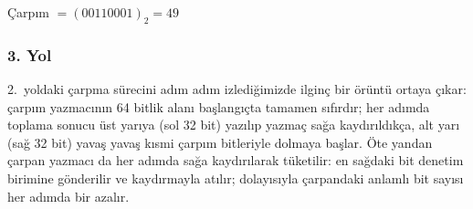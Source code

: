 \begin{ornek}[5.5]
Çarpım $= (00110001)_2 = 49$
\end{ornek}

\subsubsection{3. Yol}

2.\ yoldaki çarpma sürecini adım adım izlediğimizde ilginç bir örüntü ortaya çıkar: çarpım yazmacının 64 bitlik alanı başlangıçta tamamen sıfırdır; her adımda toplama sonucu üst yarıya (sol 32 bit) yazılıp yazmaç sağa kaydırıldıkça, alt yarı (sağ 32 bit) yavaş yavaş kısmi çarpım bitleriyle dolmaya başlar. Öte yandan çarpan yazmacı da her adımda sağa kaydırılarak tüketilir: en sağdaki bit denetim birimine gönderilir ve kaydırmayla atılır; dolayısıyla çarpandaki anlamlı bit sayısı her adımda bir azalır.

